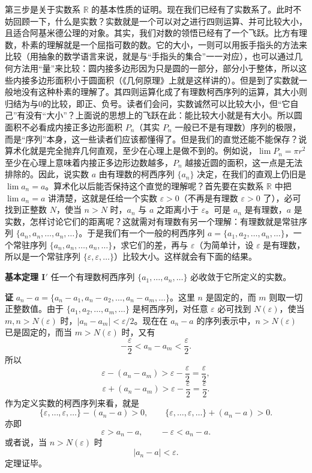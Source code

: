 第三步是关于实数系 $\mathbb R$ 的基本性质的证明。现在我们已经有了实数系了。此时不妨回顾一下，什么是实数？实数就是一个可以对之进行四则运算、并可比较大小，且适合阿基米德公理的对象。其实，我们对数的领悟已经有了一个飞跃。比方有理数，朴素的理解就是一个屈指可数的数。它的大小，一则可以用扳手指头的方法来比较（用抽象的数学语言来说，就是与“手指头的集合”一一对应），也可以通过几何方法用“量”来比较：圆内接多边形因为只是圆的一部分，部分小于整体，所以这些内接多边形面积小于圆面积（《几何原理》上就是这样讲的）。但是到了实数就一般地没有这种朴素的理解了。其四则运算化成了有理数柯西序列的运算，其大小则归结为与0的比较，即正、负号。读者们会问，实数诚然可以比较大小，但“它自己”有没有“大小”？上面说的思想上的飞跃在此：能比较大小就是有大小。所以圆面积不必看成内接正多边形面积 $P_n$（其实 $P_n$ 一般已不是有理数）序列的极限，而是“序列”本身，这一些读者们应该都懂得了。但是我们的直觉还能不能保存？说算术化就是完全抛弃几何直观，至少在心理上是做不到的。例如说，$\lim P_n=\pi r^2$ 至少在心理上意味着内接正多边形边数越多，$P_n$ 越接近圆的面积，这一点是无法排除的。因此，说实数 $a$ 由有理数的柯西序列 $\{a_n\}$ 决定，在我们的直观上仍旧是 $\lim a_n=a$。算术化以后能否保持这个直觉的理解呢？首先要在实数系 $\mathbb R$ 中把 $\lim a_n=a$ 讲清楚，这就是任给一个实数 $\varepsilon>0$（不再是有理数 $\varepsilon>0$ 了），必可找到正整数 $N$，使当 $n>N$ 时，$a_n$ 与 $a$ 之距离小于 $\varepsilon$。可是 $a_n$ 是有理数，$a$ 是实数，怎样讨论它们的距离呢？这就需对有理数有另一个理解：有理数就是常驻序列 $\{a_n,a_n,\ldots,a_n,\ldots\}$。于是我们有一个一般的柯西序列 $a=\{a_1,a_2,\ldots,a_n,\ldots\}$，一个常驻序列 $\{a_n,a_n,\ldots,a_n,\ldots\}$，求它们的差，再与 $\varepsilon$（为简单计，设 $\varepsilon$ 是有理数，所以是一个常驻序列 $\{\varepsilon,\varepsilon,\ldots\}$）比较大小。这样就会有下面的结果。

\noindent\textbf{基本定理 I$'$}\quad
任一个有理数柯西序列 $\{a_1,\ldots,a_n,\ldots\}$ 必收敛于它所定义的实数。

\noindent\textbf{证}\quad
$a_n-a=\{a_n-a_1,a_n-a_2,\ldots,a_n-a_m,\ldots\}$。这里 $n$ 是固定的，而 $m$ 则取一切正整数值。由于 $\{a_1,a_2,\ldots,a_m,\ldots\}$ 是柯西序列，对任意 $\varepsilon$ 必可找到 $N(\varepsilon)$，使当 $m,n>N(\varepsilon)$ 时，$|a_n-a_m|<\varepsilon/2$。现在在 $a_n-a$ 的序列表示中，$n>N(\varepsilon)$ 已是固定的，而当 $m>N(\varepsilon)$ 时，又有
\[
 -\frac\varepsilon2<a_n-a_m<\frac\varepsilon2.
\]
所以
\[
 \varepsilon-(a_n-a_m)>\varepsilon-\frac\varepsilon2=\frac\varepsilon2,
\]
\[
 \varepsilon+(a_n-a_m)>\varepsilon-\frac\varepsilon2=\frac\varepsilon2.
\]
作为定义实数的柯西序列来看，就是
\[
 \{\varepsilon,\ldots,\varepsilon,\ldots\}-(a_n-a)>0,
 \qquad
 \{\varepsilon,\ldots,\varepsilon,\ldots\}+(a_n-a)>0.
\]
亦即
\[
 \varepsilon>a_n-a,\qquad -\varepsilon<a_n-a.
\]
或者说，当 $n>N(\varepsilon)$ 时
\[
 |a_n-a|<\varepsilon.
\]
定理证毕。

